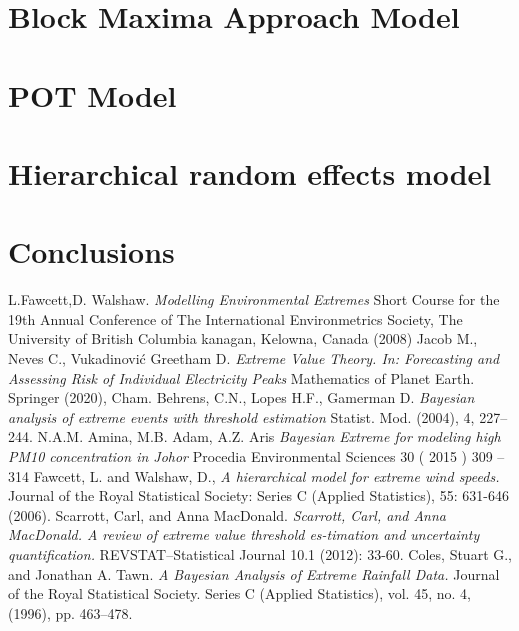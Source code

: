 \documentclass[preprint,12pt]{elsarticle}
\begin{document}
\section{Block Maxima Approach Model}
\section{POT Model}
\section{Hierarchical random effects model}
\section{Conclusions}

\clearpage
\begin{thebibliography}{99}
L.Fawcett,D. Walshaw.
\emph{Modelling Environmental Extremes}
Short Course for the 19th Annual Conference of The International Environmetrics Society, The University of British Columbia kanagan, Kelowna, Canada (2008)
Jacob M., Neves C., Vukadinović Greetham D.  
\emph{Extreme Value Theory. In: Forecasting and Assessing Risk of Individual Electricity Peaks}
Mathematics of Planet Earth. Springer (2020), Cham. 
Behrens, C.N., Lopes H.F., Gamerman D.  
\emph{Bayesian analysis of extreme
events with threshold estimation}
Statist. Mod.  (2004), 4, 227–244.
N.A.M. Amina, M.B. Adam, A.Z. Aris
\emph{Bayesian Extreme for modeling high PM10 concentration in Johor }
Procedia Environmental Sciences 30 ( 2015 ) 309 – 314 
Fawcett, L. and Walshaw, D.,
\emph{ A hierarchical model for extreme wind speeds.}
Journal of the Royal Statistical Society: Series C (Applied Statistics), 55: 631-646 (2006). 
Scarrott, Carl, and Anna MacDonald. 
\emph{Scarrott, Carl, and Anna MacDonald. A review of extreme value threshold es-timation and uncertainty quantification.}
REVSTAT–Statistical Journal 10.1 (2012): 33-60.
Coles, Stuart G., and Jonathan A. Tawn. 
\emph{A Bayesian Analysis of Extreme Rainfall Data.} 
Journal of the Royal Statistical Society. Series C (Applied Statistics), vol. 45, no. 4, (1996), pp. 463–478. 
\end{thebibliography}
\end{document}

